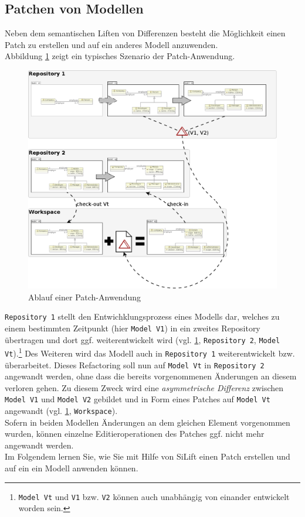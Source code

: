 \subsection{Patchen von Modellen}
Neben dem semantischen Liften von Differenzen besteht die Möglichkeit einen Patch zu erstellen und auf ein anderes Modell anzuwenden.\\

Abbildung \ref{silift-tutorial_patching_scenario} zeigt ein typisches Szenario der Patch-Anwendung.

\begin{figure}[h!]
\centering
\includegraphics[width=\textwidth]{patching/graphics/silift-tutorial_patching_scenario.png}
\caption{Ablauf einer Patch-Anwendung}
\label{silift-tutorial_patching_scenario}
\end{figure}



\texttt{Repository 1} stellt den Entwichklungsprozess eines Modells dar, welches zu einem bestimmten Zeitpunkt (hier \texttt{Model V1}) in ein zweites Repository übertragen und dort ggf. weiterentwickelt wird (vgl. \ref{silift-tutorial_patching_scenario}, \texttt{Repository 2}, \texttt{Model Vt}).\footnote{\texttt{Model Vt} und \texttt{V1} bzw. \texttt{V2} können auch unabhängig von einander entwickelt worden sein.} 
Des Weiteren wird das Modell auch in \texttt{Repository 1} weiterentwickelt bzw. überarbeitet.
Dieses Refactoring soll nun auf \texttt{Model Vt} in \texttt{Repository 2} angewandt werden, ohne dass die bereits vorgenommenen Änderungen an diesem verloren gehen.
Zu diesem Zweck wird eine \textit{asymmetrische Differenz} zwischen \texttt{Model V1} und \texttt{Model V2} gebildet und in Form eines Patches auf \texttt{Model Vt} angewandt (vgl. \ref{silift-tutorial_patching_scenario}, \texttt{Workspace}).\\
Sofern in beiden Modellen Änderungen an dem gleichen Element vorgenommen wurden,  können einzelne Editieroperationen des Patches ggf. nicht mehr angewandt werden.\\

Im Folgendem lernen Sie, wie Sie mit Hilfe von SiLift einen Patch erstellen und auf ein ein Modell anwenden können.



